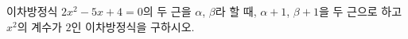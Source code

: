 이차방정식 $2x^2-5x+4=0$의 두 근을 $\alpha$, $\beta$라 할 때, $\alpha+1$, $\beta+1$을 두 근으로 하고 $x^2$의 계수가 $2$인 이차방정식을 구하시오.
